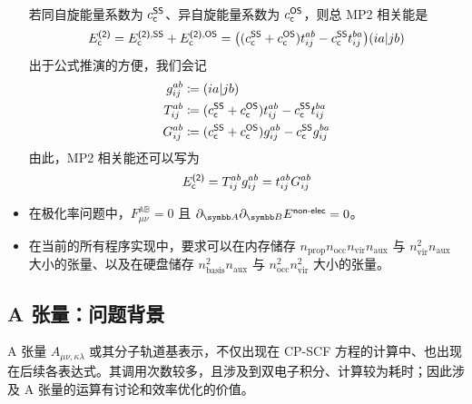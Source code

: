 \begin{itemize}[nosep]
\begin{align}
        \end{align}
        若同自旋能量系数为 $c_{\textsf{c}}^{\textsf{SS}}$、异自旋能量系数为 $c_{\textsf{c}}^{\textsf{OS}}$，则总 MP2 相关能是
        \begin{equation}
          E_{\textsf{c}}^{\textsf{(2)}} = E_{\textsf{c}}^{\textsf{(2)}, \textsf{SS}} + E_{\textsf{c}}^{\textsf{(2)}, \textsf{OS}} = \big( (c_{\textsf{c}}^{\textsf{SS}} + c_{\textsf{c}}^{\textsf{OS}}) t_{ij}^{ab} - c_{\textsf{c}}^{\textsf{SS}} t_{ij}^{ba} \big) (ia|jb)
        \end{equation}
        出于公式推演的方便，我们会记
        \begin{align}
            \label{eq.3.def.g-ijab}
            g_{ij}^{ab} &\coloneq (ia|jb) \\
            \label{eq.3.def.T-ijab}
            T_{ij}^{ab} &\coloneq (c_{\textsf{c}}^{\textsf{SS}} + c_{\textsf{c}}^{\textsf{OS}}) t_{ij}^{ab} - c_{\textsf{c}}^{\textsf{SS}} t_{ij}^{ba} \\
            \label{eq.3.def.G-ijab}
            G_{ij}^{ab} &\coloneq (c_{\textsf{c}}^{\textsf{SS}} + c_{\textsf{c}}^{\textsf{OS}}) g_{ij}^{ab} - c_{\textsf{c}}^{\textsf{SS}} g_{ij}^{ba}
        \end{align}
        由此，MP2 相关能还可以写为
        \begin{align}
            \label{eq.3.emp2-by-T}
            E_{\textsf{c}}^{\textsf{(2)}} = T_{ij}^{ab} g_{ij}^{ab} = t_{ij}^{ab} G_{ij}^{ab}
        \end{align}
    \item 在极化率问题中，$F_{\mu \nu}^\mathbb{AB} = 0$ 且 $\partial_\mathbb{A} \partial_\mathbb{B} E^\textmt{non-elec} = 0$。
    \item 在当前的所有程序实现中，要求可以在内存储存 $n_\mathrm{prop} n_\mathrm{occ} n_\mathrm{vir} n_\mathrm{aux}$ 与 $n_\mathrm{vir}^2 n_\mathrm{aux}$ 大小的张量、以及在硬盘储存 $n_\mathrm{basis}^2 n_\mathrm{aux}$ 与 $n_\mathrm{occ}^2 n_\mathrm{vir}^2$ 大小的张量。%
\end{itemize}

\subsection{A 张量：问题背景}

A 张量 $A_{\mu \nu, \kappa \lambda}$ 或其分子轨道基表示，不仅出现在 CP-SCF 方程的计算中、也出现在后续各表达式。其调用次数较多，且涉及到双电子积分、计算较为耗时；因此涉及 A 张量的运算有讨论和效率优化的价值。

